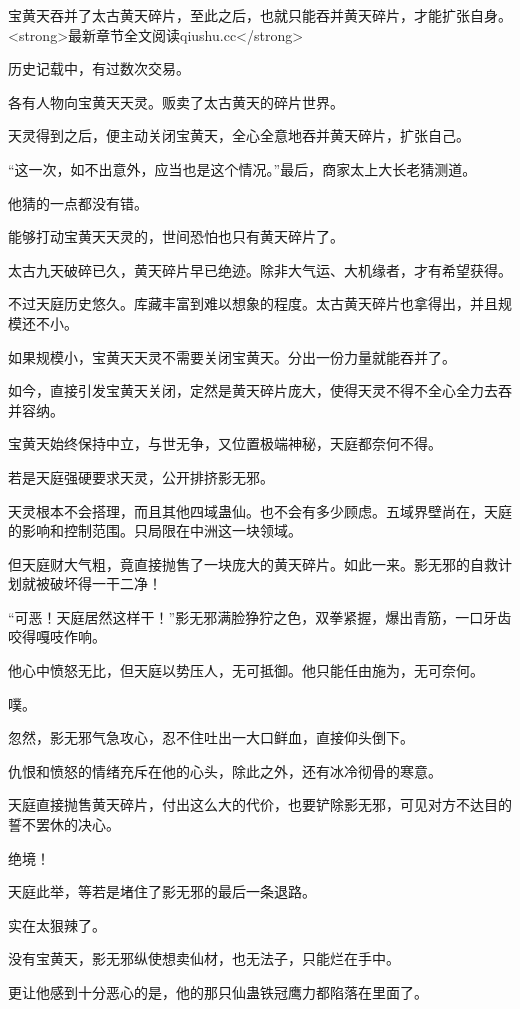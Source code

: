 \begin{this_body}
宝黄天吞并了太古黄天碎片，至此之后，也就只能吞并黄天碎片，才能扩张自身。<strong>最新章节全文阅读qiushu.cc</strong>

历史记载中，有过数次交易。

各有人物向宝黄天天灵。贩卖了太古黄天的碎片世界。

天灵得到之后，便主动关闭宝黄天，全心全意地吞并黄天碎片，扩张自己。

“这一次，如不出意外，应当也是这个情况。”最后，商家太上大长老猜测道。

他猜的一点都没有错。

能够打动宝黄天天灵的，世间恐怕也只有黄天碎片了。

太古九天破碎已久，黄天碎片早已绝迹。除非大气运、大机缘者，才有希望获得。

不过天庭历史悠久。库藏丰富到难以想象的程度。太古黄天碎片也拿得出，并且规模还不小。

如果规模小，宝黄天天灵不需要关闭宝黄天。分出一份力量就能吞并了。

如今，直接引发宝黄天关闭，定然是黄天碎片庞大，使得天灵不得不全心全力去吞并容纳。

宝黄天始终保持中立，与世无争，又位置极端神秘，天庭都奈何不得。

若是天庭强硬要求天灵，公开排挤影无邪。

天灵根本不会搭理，而且其他四域蛊仙。也不会有多少顾虑。五域界壁尚在，天庭的影响和控制范围。只局限在中洲这一块领域。

但天庭财大气粗，竟直接抛售了一块庞大的黄天碎片。如此一来。影无邪的自救计划就被破坏得一干二净！

“可恶！天庭居然这样干！”影无邪满脸狰狞之色，双拳紧握，爆出青筋，一口牙齿咬得嘎吱作响。

他心中愤怒无比，但天庭以势压人，无可抵御。他只能任由施为，无可奈何。

噗。

忽然，影无邪气急攻心，忍不住吐出一大口鲜血，直接仰头倒下。

仇恨和愤怒的情绪充斥在他的心头，除此之外，还有冰冷彻骨的寒意。

天庭直接抛售黄天碎片，付出这么大的代价，也要铲除影无邪，可见对方不达目的誓不罢休的决心。

绝境！

天庭此举，等若是堵住了影无邪的最后一条退路。

实在太狠辣了。

没有宝黄天，影无邪纵使想卖仙材，也无法子，只能烂在手中。

更让他感到十分恶心的是，他的那只仙蛊铁冠鹰力都陷落在里面了。


\end{this_body}
